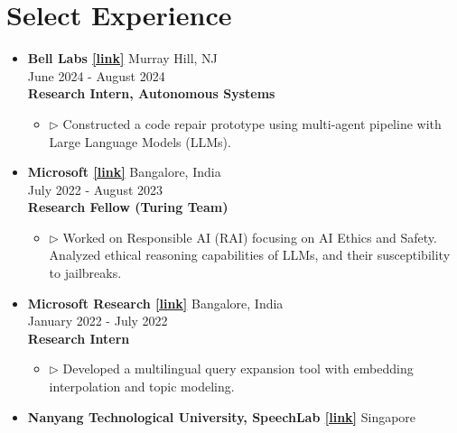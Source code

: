 \documentclass[11pt,letterpaper]{article}
\begin{document}
\section*{Select Experience}
\begin{itemize}[leftmargin=*,label={},itemsep=4pt]
    \item \textbf{Bell Labs  \href{https://www.bell-labs.com/}{[link]}} \hfill Murray Hill, NJ\\
        \hfill June 2024 - August 2024\\
        \textbf{\textit{} Research Intern, Autonomous Systems}\\
        \begin{itemize}
        \item $\triangleright$ Constructed a code repair prototype using multi-agent pipeline with Large Language Models (LLMs).\\
        \end{itemize}
    \item \textbf{Microsoft  \href{https://www.microsoft.com/en-in/research/theme/artificial-intelligence/}{[link]}} \hfill Bangalore, India\\
        \hfill July 2022 - August 2023\\
        \textbf{\textit{} Research Fellow (Turing Team)}\\
        \begin{itemize}
        \item $\triangleright$ Worked on Responsible AI (RAI) focusing on AI Ethics and Safety. Analyzed ethical reasoning capabilities of LLMs, and their susceptibility to jailbreaks.\\
        \end{itemize}
    \item \textbf{Microsoft Research  \href{https://www.microsoft.com/en-us/research/}{[link]}} \hfill Bangalore, India\\
        \hfill January 2022 - July 2022\\
        \textbf{\textit{} Research Intern}\\
        \begin{itemize}
        \item $\triangleright$ Developed a multilingual query expansion tool with embedding interpolation and topic modeling.\\
        \end{itemize}
    \item \textbf{Nanyang Technological University, SpeechLab  \href{https://www.ntu.edu.sg/speechlab}{[link]}} \hfill Singapore\\

\end{itemize}
\end{document}
